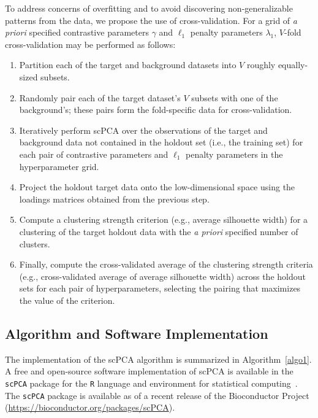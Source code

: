 To address concerns of overfitting and to avoid discovering non-generalizable patterns from the data, we propose the use of cross-validation. For a grid of \textit{a priori} specified contrastive parameters $\gamma$ and $\ell_1$ penalty parameters $\lambda_1$, $V$-fold cross-validation may be performed as follows:
\begin{enumerate}
  \itemsep0pt
  \item Partition each of the target and     
     background datasets into $V$ roughly
     equally-sized subsets.
   \item Randomly pair each of the target dataset's $V$ subsets with one of the
     background's; these pairs form the fold-specific data for cross-validation.
   \item Iteratively perform scPCA over the 
     observations of the target and
     background data not contained in the holdout set (i.e., the training set)
     for each pair of contrastive parameters and $\ell_1$ penalty parameters in
     the hyperparameter grid.
  \item Project the holdout target data onto the    low-dimensional space using
     the loadings matrices obtained from the previous step.
  \item Compute a clustering strength criterion (e.g., average
  silhouette width) for a clustering of the target holdout data with the \textit{a priori}
  specified number of clusters.
  \item Finally, compute the cross-validated average of the clustering
  strength criteria (e.g., cross-validated average of average silhouette width)
  across the holdout sets for each pair of hyperparameters, selecting the
  pairing that maximizes the value of the criterion.
\end{enumerate}

\subsection{Algorithm and Software Implementation}

The implementation of the scPCA algorithm is summarized in
Algorithm~\ref{algo1}. A free and open-source software implementation of scPCA is
available in the \texttt{scPCA} package for the \texttt{R} language and
environment for statistical computing~\citep{R}. The \texttt{scPCA} package is available as of a recent release of the Bioconductor Project
\citep{gentleman2004bioconductor,gentleman2006bioinformatics,huber2015orchestrating} (\url{https://bioconductor.org/packages/scPCA}).

